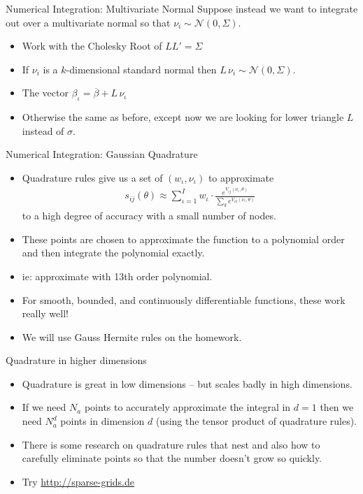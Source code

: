 \begin{frame}{Numerical Integration: Multivariate Normal}
Suppose instead we want to integrate out over a multivariate normal so that $\nu_i \sim \mathcal{N}(0,\Sigma)$.

\begin{itemize}
\item Work with the \alert{Cholesky Root} of $L L' = \Sigma$
\item If $\nu_i$ is a $k$-dimensional \alert{standard normal} then $L\, \nu_i \sim \mathcal{N}(0,\Sigma)$.
\item The vector $\beta_{\iota} = \overline{\beta} + L\, \nu_{\iota}$
\item Otherwise the same as before, except now we are looking for \alert{lower triangle} $L$ instead of $\sigma$.
\end{itemize}
\end{frame}



\begin{frame}{Numerical Integration: Gaussian Quadrature}
\begin{itemize}
\item Quadrature rules give us a set of $(w_{\iota},\nu_{\iota})$ to approximate
\begin{align*}
s_{ij}(\theta)
\approx \sum_{\iota=1}^{I} w_{\iota} \cdot \frac{ e^{V_{ij}(\nu_{\iota},\theta)}}{\sum_k e^{V_{ik}(\nu_{\iota},\theta)}} 
\end{align*}
to a high degree of accuracy with a small number of \alert{nodes}.
\item These points are chosen to approximate the function to a \alert{polynomial order} and then integrate the polynomial exactly.
\item ie: approximate with 13th order polynomial.
\item For smooth, bounded, and continuously differentiable functions, these work really well!
\item We will use \alert{Gauss Hermite} rules on the homework.
\end{itemize}
\end{frame}





\begin{frame}{Quadrature in higher dimensions}
\begin{itemize}
\item Quadrature is great in low dimensions -- but scales badly in high dimensions.
\item If we need $N_a$ points to accurately approximate the integral in $d=1$ then we need $N_a^d$ points in dimension $d$ (using the tensor product of quadrature rules).
\item There is some research on quadrature rules that nest and also how to carefully eliminate points so that the number doesn't grow so quickly.
\item Try \url{http://sparse-grids.de}
\end{itemize}
\end{frame}

